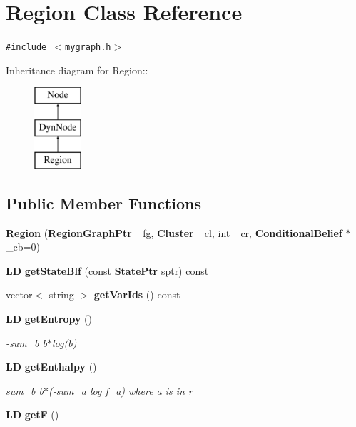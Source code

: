 \section{Region Class Reference}
\label{classRegion}
{\tt \#include $<$mygraph.h$>$}

Inheritance diagram for Region::\begin{figure}[H]
\begin{center}
\leavevmode
\includegraphics[height=3cm]{classRegion}
\end{center}
\end{figure}
\subsection*{Public Member Functions}
\begin{CompactItemize}
\item 
{\bf Region} ({\bf RegionGraphPtr} \_\-fg, {\bf Cluster} \_\-cl, int \_\-cr, {\bf ConditionalBelief} $\ast$\_\-cb=0)
\item 
{\bf LD} {\bf getStateBlf} (const {\bf StatePtr} sptr) const
\item 
vector$<$ string $>$ {\bf getVarIds} () const
\item 
{\bf LD} {\bf getEntropy} ()
\begin{CompactList}\small\item\em -sum\_\-b b$\ast$log(b) \item\end{CompactList}\item 
{\bf LD} {\bf getEnthalpy} ()
\begin{CompactList}\small\item\em sum\_\-b b$\ast$(-sum\_\-a log f\_\-a) where a is in r \item\end{CompactList}\item 
{\bf LD} {\bf getF} ()
\end{CompactItemize}
